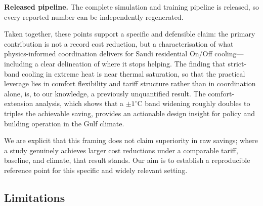 \documentclass[12pt,a4paper]{article}
\begin{document}
\textbf{Released pipeline.} The complete simulation and training pipeline is released, so every reported number can be independently regenerated.

Taken together, these points support a specific and defensible claim: the primary contribution is not a record cost reduction, but a characterisation of what physics-informed coordination delivers for Saudi residential On/Off cooling---including a clear delineation of where it stops helping. The finding that strict-band cooling in extreme heat is near thermal saturation, so that the practical leverage lies in comfort flexibility and tariff structure rather than in coordination alone, is, to our knowledge, a previously unquantified result. The comfort-extension analysis, which shows that a $\pm1^\circ$C band widening roughly doubles to triples the achievable saving, provides an actionable design insight for policy and building operation in the Gulf climate.

We are explicit that this framing does not claim superiority in raw savings; where a study genuinely achieves larger cost reductions under a comparable tariff, baseline, and climate, that result stands. Our aim is to establish a reproducible reference point for this specific and widely relevant setting.

\subsection{Limitations}
\end{document}
